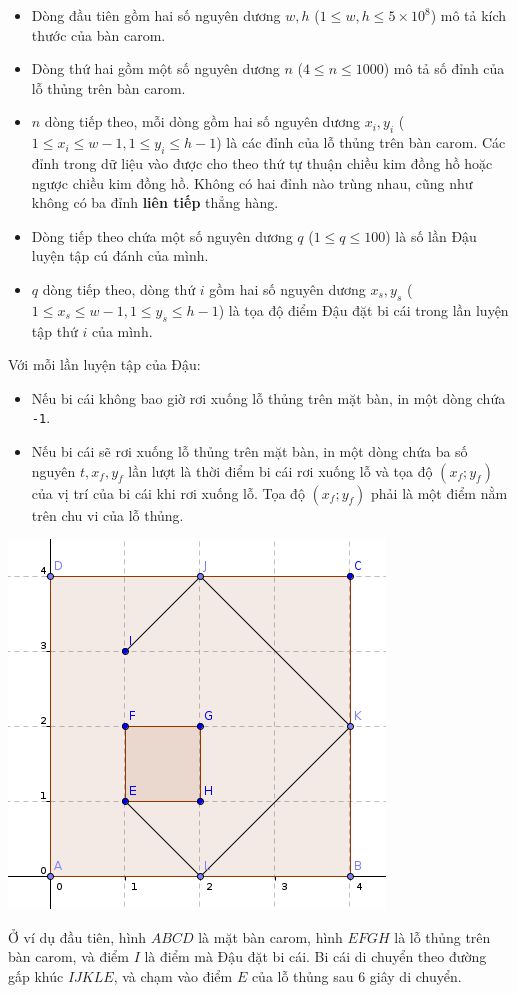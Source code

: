 \documentclass[11pt,a4paper,oneside]{article}
\begin{document}
\begin{itemize}
\item Dòng đầu tiên gồm hai số nguyên dương $w, h$ ($1 \leq w,h \leq 5 \times 10^8$) mô tả kích thước của bàn carom.
\item Dòng thứ hai gồm một số nguyên dương $n$ ($4 \leq n \leq 1000$) mô tả số đỉnh của lỗ thủng trên bàn carom.
\item $n$ dòng tiếp theo, mỗi dòng gồm hai số nguyên dương $x_i, y_i$ ($1 \leq x_i \leq w-1, 1 \leq y_i \leq h-1$) là các đỉnh của lỗ thủng trên bàn carom. Các đỉnh trong dữ liệu vào được cho theo thứ tự thuận chiều kim đồng hồ hoặc ngược chiều kim đồng hồ. Không có hai đỉnh nào trùng nhau, cũng như không có ba đỉnh \textbf{liên tiếp} thẳng hàng. 
\item Dòng tiếp theo chứa một số nguyên dương $q$ ($1 \leq q \leq 100$) là số lần Đậu luyện tập cú đánh của mình.
\item $q$ dòng tiếp theo, dòng thứ $i$ gồm hai số nguyên dương $x_s, y_s$ ($1 \leq x_s \leq w-1, 1 \leq y_s \leq h-1$) là tọa độ điểm Đậu đặt bi cái trong lần luyện tập thứ $i$ của mình. 
\end{itemize}
Với mỗi lần luyện tập của Đậu:
\begin{itemize}
\item Nếu bi cái không bao giờ rơi xuống lỗ thủng trên mặt bàn, in một dòng chứa \texttt{-1}.
\item Nếu bi cái sẽ rơi xuống lỗ thủng trên mặt bàn, in một dòng chứa ba số nguyên $t, x_f, y_f$ lần lượt là thời điểm bi cái rơi xuống lỗ và tọa độ $(x_f; y_f)$ của vị trí của bi cái khi rơi xuống lỗ. Tọa độ $(x_f; y_f)$ phải là một điểm nằm trên chu vi của lỗ thủng.
\end{itemize} 
\begin{example}
%
\end{example}
\begin{center}
\includegraphics[scale=0.5]{carom2.png} 
\end{center}
Ở ví dụ đầu tiên, hình $ABCD$ là mặt bàn carom, hình $EFGH$ là lỗ thủng trên bàn carom, và điểm $I$ là điểm mà Đậu đặt bi cái. Bi cái di chuyển theo đường gấp khúc $IJKLE$, và chạm vào điểm $E$ của lỗ thủng sau 6 giây di chuyển.
\end{document}
